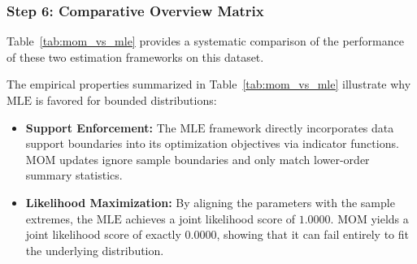 \documentclass{article}
\begin{document}
\subsubsection{Step 6: Comparative Overview Matrix}
Table~\ref{tab:mom_vs_mle} provides a systematic comparison of the performance of these two estimation frameworks on this dataset.

\begin{table}[htbp]
\centering
\small
{}
\caption{Comparative Analysis of MOM vs. MLE Estimators Under Bounded Support Constraints}
\label{tab:mom_vs_mle}
\end{table}

The empirical properties summarized in Table~\ref{tab:mom_vs_mle} illustrate why $\text{MLE}$ is favored for bounded distributions:
\begin{itemize}
    \item \textbf{Support Enforcement:} The $\text{MLE}$ framework directly incorporates data support boundaries into its optimization objectives via indicator functions. $\text{MOM}$ updates ignore sample boundaries and only match lower-order summary statistics.
    \item \textbf{Likelihood Maximization:} By aligning the parameters with the sample extremes, the $\text{MLE}$ achieves a joint likelihood score of $1.0000$. $\text{MOM}$ yields a joint likelihood score of exactly $0.0000$, showing that it can fail entirely to fit the underlying distribution.
\end{itemize}
\end{document}
